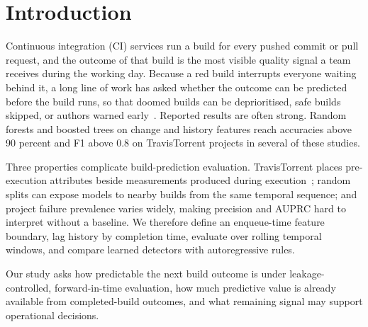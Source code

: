 \documentclass[sigconf,review,anonymous,nonacm]{acmart}
\begin{document}


\maketitle

\section{Introduction}
\label{sec:intro}

Continuous integration (CI) services run a build for every pushed commit or pull request, and the outcome of that build is the most visible quality signal a team receives during the working day. Because a red build interrupts everyone waiting behind it, a long line of work has asked whether the outcome can be predicted before the build runs, so that doomed builds can be deprioritised, safe builds skipped, or authors warned early~\cite{hassan2006, hassanwang2017, nili2017, xiali2017, chen2020buildfast, jin2020, abdalkareem2021skip, saidani2020, saidani2022, sun2024ravenbuild}. Reported results are often strong. Random forests and boosted trees on change and history features reach accuracies above 90 percent and F1 above 0.8 on TravisTorrent projects in several of these studies.

Three properties complicate build-prediction evaluation. TravisTorrent places pre-execution attributes beside measurements produced during execution~\cite{beller2017travistorrent}; random splits can expose models to nearby builds from the same temporal sequence; and project failure prevalence varies widely, making precision and AUPRC hard to interpret without a baseline. We therefore define an enqueue-time feature boundary, lag history by completion time, evaluate over rolling temporal windows, and compare learned detectors with autoregressive rules.

Our study asks how predictable the next build outcome is under leakage-controlled, forward-in-time evaluation, how much predictive value is already available from completed-build outcomes, and what remaining signal may support operational decisions.
\end{document}
